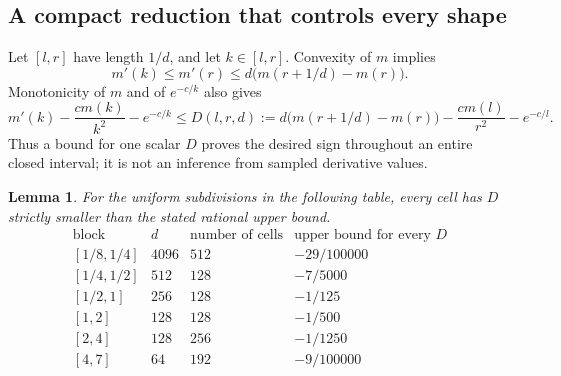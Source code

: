 \documentclass[11pt,a4paper]{article}
\numberwithin{equation}{section}
\newtheorem{lemma}[theorem]{Lemma}
\theoremstyle{definition}
\theoremstyle{remark}
\begin{document}
\subsection{A compact reduction that controls every shape}
Let $[l,r]$ have length $1/d$, and let $k\in[l,r]$.
Convexity of $m$ implies
\[
 m'(k)\le m'(r)
 \le d\bigl(m(r+1/d)-m(r)\bigr).
\]
Monotonicity of $m$ and of $e^{-c/k}$ also gives
\begin{equation}\label{add47heisei:eq:cell}
 m'(k)-\frac{cm(k)}{k^2}-e^{-c/k}
 \le D(l,r,d):=
 d\bigl(m(r+1/d)-m(r)\bigr)
 -\frac{cm(l)}{r^2}-e^{-c/l}.
\end{equation}
Thus a bound for one scalar $D$ proves the desired sign throughout an
entire closed interval; it is not an inference from sampled derivative
values.

\begin{lemma}\label{add47heisei:lem:certificate}
For the uniform subdivisions in the following table, every cell has
$D$ strictly smaller than the stated rational upper bound.
\[
\begin{array}{c|r|r|c}
\text{block}&d&\text{number of cells}&\text{upper bound for every }D\\\hline
{[1/8,1/4]}&4096&512&-29/100000\\
{[1/4,1/2]}&512&128&-7/5000\\
{[1/2,1]}&256&128&-1/125\\
{[1,2]}&128&128&-1/500\\
{[2,4]}&128&256&-1/1250\\
{[4,7]}&64&192&-9/100000
\end{array}
\]
\end{lemma}
\end{document}
